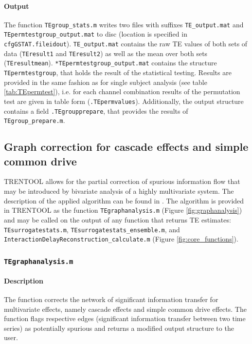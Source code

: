 \documentclass[a4paper,10pt]{article}
\begin{document}
\paragraph*{Output} The function \texttt{TEgroup\_stats.m} writes two files with suffixes \texttt{TE\_output.mat} and \texttt{TEpermtestgroup\_output.mat} to disc (location is specified in \texttt{cfgGSTAT.fileidout}). \texttt{TE\_output.mat} contains the raw TE values of both sets of data (\texttt{TEresult1} and \texttt{TEresult2}) as well as the mean over both sets (\texttt{TEresultmean}). \texttt{*TEpermtestgroup\_output.mat} contains the structure \texttt{TEpermtestgroup}, that holds the result of the statistical testing. Results are provided in the same fashion as for single subject analysis (see table \ref{tab:TEpermtest}), i.e. for each channel combination results of the permutation test are given in table form (\texttt{.TEpermvalues}). Additionally, the output structure contains a field \texttt{.TEgroupprepare}, that provides the results of \texttt{TEgroup\_prepare.m}.


\subsection{Graph correction for cascade effects and simple common drive} \label{sec:graphanalysis}

TRENTOOL allows for the partial correction of spurious information flow that may be introduced by bivariate analysis of a highly multivariate system. The description of the applied algorithm can be found in \cite{wollstadt2013}. The algorithm is provided in TRENTOOL as the function \verb&TEgraphanalysis.m& (Figure \ref{fig:graphanalysis}) and may be called on the output of any function that returns TE estimates: \verb&TEsurrogatestats.m&, \verb&TEsurrogatestats_ensemble.m&, and \verb&InteractionDelayReconstruction_calculate.m& (Figure \ref{fig:core_functions}). 


\subsubsection*{\texttt{TEgraphanalysis.m}}

\paragraph*{Description} The function corrects the network of significant information transfer for multivariate effects, namely cascade effects and simple common drive effects. The function flags respective edges (significant information transfer between two time series) as potentially spurious and returns a modified output structure to the user.
\end{document}
